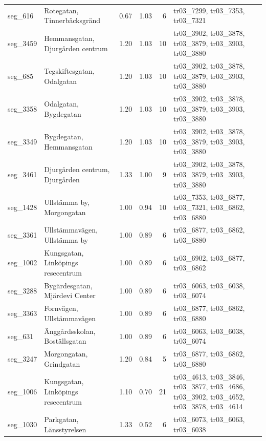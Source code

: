 \begin{table}[H]
{\begin{tabular}{
l
>{\raggedright\arraybackslash}p{4.0cm}
r
r
r
>{\raggedright\arraybackslash}p{7.0cm}
}
seg\_616 & Rotegatan, Tinnerbäcksgränd & 0.67 & 1.03 & 6 & \cellcolor{orange!20}tr03\_7299, tr03\_7353, tr03\_7321 \\
seg\_3459 & Hemmansgatan, Djurgården centrum & 1.20 & 1.03 & 10 & \cellcolor{yellow!30}tr03\_3902, tr03\_3878, tr03\_3879, tr03\_3903, tr03\_3880 \\
seg\_685 & Tegskiftesgatan, Odalgatan & 1.20 & 1.03 & 10 & \cellcolor{yellow!30}tr03\_3902, tr03\_3878, tr03\_3879, tr03\_3903, tr03\_3880 \\
seg\_3358 & Odalgatan, Bygdegatan & 1.20 & 1.03 & 10 & \cellcolor{yellow!30}tr03\_3902, tr03\_3878, tr03\_3879, tr03\_3903, tr03\_3880 \\
seg\_3349 & Bygdegatan, Hemmansgatan & 1.20 & 1.03 & 10 & \cellcolor{yellow!30}tr03\_3902, tr03\_3878, tr03\_3879, tr03\_3903, tr03\_3880 \\
seg\_3461 & Djurgården centrum, Djurgården & 1.33 & 1.00 & 9 & \cellcolor{yellow!30}tr03\_3902, tr03\_3878, tr03\_3879, tr03\_3903, tr03\_3880 \\
seg\_1428 & Ullstämma by, Morgongatan & 1.00 & 0.94 & 10 & \cellcolor{green!18}tr03\_7353, tr03\_6877, tr03\_7321, tr03\_6862, tr03\_6880 \\
seg\_3361 & Ullstämmavägen, Ullstämma by & 1.00 & 0.89 & 6 & \cellcolor{cyan!18}tr03\_6877, tr03\_6862, tr03\_6880 \\
seg\_1002 & Kungsgatan, Linköpings resecentrum & 1.00 & 0.89 & 6 & \cellcolor{blue!12}tr03\_6902, tr03\_6877, tr03\_6862 \\
seg\_3288 & Bygärdesgatan, Mjärdevi Center & 1.00 & 0.89 & 6 & \cellcolor{purple!12}tr03\_6063, tr03\_6038, tr03\_6074 \\
seg\_3363 & Fornvägen, Ullstämmavägen & 1.00 & 0.89 & 6 & \cellcolor{cyan!18}tr03\_6877, tr03\_6862, tr03\_6880 \\
seg\_631 & Änggårdsskolan, Boställsgatan & 1.00 & 0.89 & 6 & \cellcolor{purple!12}tr03\_6063, tr03\_6038, tr03\_6074 \\
seg\_3247 & Morgongatan, Grindgatan & 1.20 & 0.84 & 5 & \cellcolor{cyan!18}tr03\_6877, tr03\_6862, tr03\_6880 \\
seg\_1006 & Kungsgatan, Linköpings resecentrum & 1.10 & 0.70 & 21 & \cellcolor{gray!15}tr03\_4613, tr03\_3846, tr03\_3877, tr03\_4686, tr03\_3902, tr03\_4652, tr03\_3878, tr03\_4614 \\
seg\_1030 & Parkgatan, Länsstyrelsen & 1.33 & 0.52 & 6 & \cellcolor{teal!15}tr03\_6073, tr03\_6063, tr03\_6038 \\
\bottomrule
\end{tabular}%
}
\end{table}

